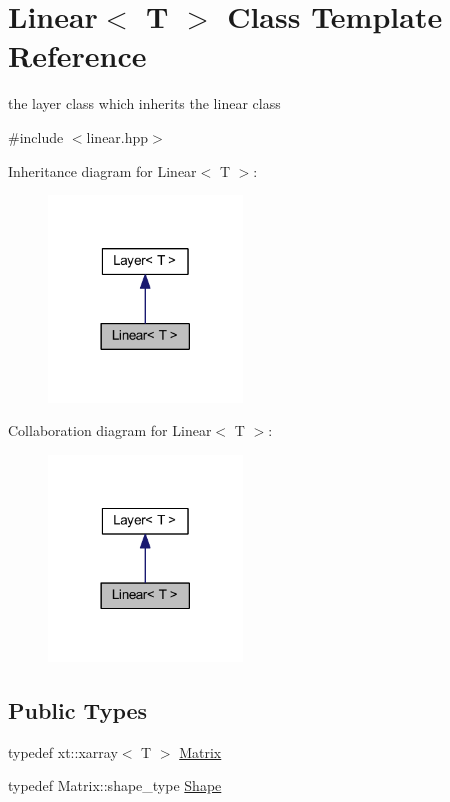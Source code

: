 \hypertarget{class_linear}{}\section{Linear$<$ T $>$ Class Template Reference}
\label{class_linear}


the layer class which inherits the linear class  




{\ttfamily \#include $<$linear.\+hpp$>$}



Inheritance diagram for Linear$<$ T $>$\+:
\nopagebreak
\begin{figure}[H]
\begin{center}
\leavevmode
\includegraphics[width=146pt]{class_linear__inherit__graph}
\end{center}
\end{figure}


Collaboration diagram for Linear$<$ T $>$\+:
\nopagebreak
\begin{figure}[H]
\begin{center}
\leavevmode
\includegraphics[width=146pt]{class_linear__coll__graph}
\end{center}
\end{figure}
\subsection*{Public Types}
\begin{DoxyCompactItemize}
\item 
typedef xt\+::xarray$<$ T $>$ \mbox{\hyperlink{class_linear_a8e402d70272bdb6406745f7ec4139f16}{Matrix}}
\item 
typedef Matrix\+::shape\+\_\+type \mbox{\hyperlink{class_linear_afeccdcd7a158d0fe034436e4eafae066}{Shape}}
\end{DoxyCompactItemize}
